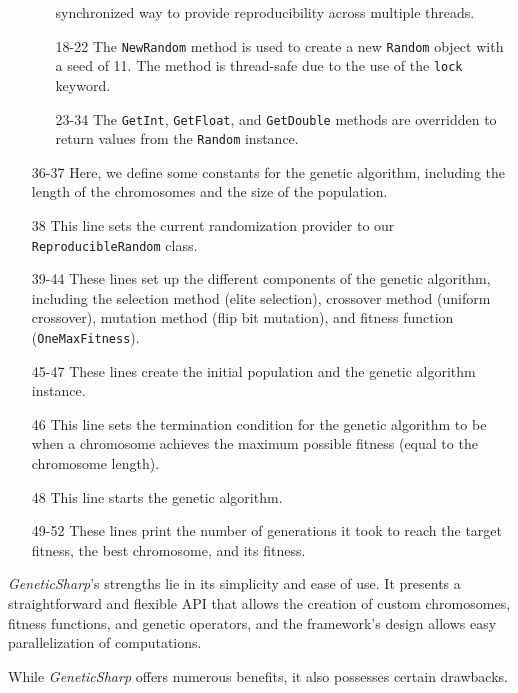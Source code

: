 \begin{enumerate}
\begin{enumerate}
          synchronized way to provide reproducibility across multiple threads.
        \item[18-22] The \texttt{NewRandom} method is used to 
          create a new \texttt{Random} object with a seed of 11.
          The method is thread-safe due to the use of the 
          \texttt{lock} keyword.
        \item[23-34] The \texttt{GetInt}, 
          \texttt{GetFloat}, and \texttt{GetDouble} 
          methods are overridden to return values from the 
          \texttt{Random} instance.
      \end{enumerate}
    \item[36-37] Here, we define some constants for the genetic algorithm, 
      including the length of the chromosomes and the size of the population.
    \item[38] This line sets the current randomization provider to our 
      \texttt{ReproducibleRandom} class.
    \item[39-44] These lines set up the different components of the genetic 
      algorithm, including the selection method (elite selection), crossover 
      method (uniform crossover), mutation method (flip bit mutation), and 
      fitness function (\texttt{OneMaxFitness}).
    \item[45-47] These lines create the initial population and the genetic 
      algorithm instance.
    \item[46] This line sets the termination condition for the genetic 
      algorithm to be when a chromosome achieves the maximum possible fitness 
      (equal to the chromosome length).
    \item[48] This line starts the genetic algorithm.
    \item[49-52] These lines print the number of generations it took to reach the target fitness, the best chromosome, and its fitness.
  \end{enumerate}

  \textit{GeneticSharp}'s strengths lie in its simplicity and ease of use.
  It presents a straightforward and flexible API that allows the creation of 
  custom chromosomes, fitness functions, and genetic operators, and the 
  framework's design allows easy parallelization of computations.

  While \textit{GeneticSharp} offers numerous benefits, it also possesses 
  certain drawbacks.

